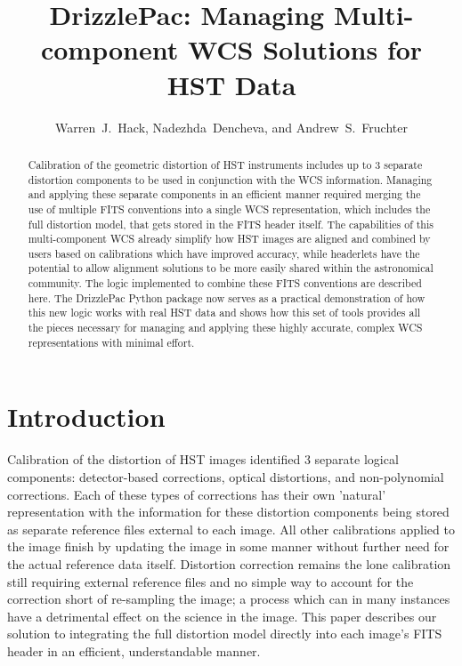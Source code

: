 \documentclass[11pt,twoside]{article}
\begin{document}
\title{DrizzlePac: Managing Multi-component WCS Solutions for HST Data}
\author{Warren~J.~Hack, Nadezhda~Dencheva, and Andrew~S.~Fruchter
}

\begin{abstract}
Calibration of the geometric distortion of HST instruments includes up to 3 separate distortion components to be used in conjunction with the WCS information. Managing and applying these separate components in an efficient manner required merging the use of multiple FITS conventions into a single WCS representation, which includes the full distortion model, that gets stored in the FITS header itself. The capabilities of this multi-component WCS already simplify how HST images are aligned and combined by users based on calibrations which have improved accuracy, while headerlets have the potential to allow alignment solutions to be more easily shared within the astronomical community. The logic implemented to combine these FITS conventions are described here. The DrizzlePac Python package now serves as a practical demonstration of how this new logic works with real HST data and shows how this set of tools provides all the pieces necessary for managing and applying these highly accurate, complex WCS representations with minimal effort. 
\end{abstract}

\section{Introduction}
Calibration of the distortion of HST images identified 3 separate logical components: detector-based corrections, optical distortions, and non-polynomial corrections. Each of these types of corrections has their own 'natural' representation with the information for these distortion components being stored as separate reference files external to each image. All other calibrations applied to the image finish by updating the image in some manner without further need for the actual reference data itself. Distortion correction remains the lone calibration still requiring external reference files and no simple way to account for the correction short of re-sampling the image; a process which can in many instances have a detrimental effect on the science in the image. This paper describes our solution to integrating the full distortion model directly into each image's FITS header in an efficient, understandable manner.
\end{document}
